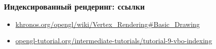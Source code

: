 \documentclass{beamer}
\begin{document}
\begin{frame}[fragile]
\frametitle{Индексированный рендеринг: ссылки}
\begin{itemize}
\item \href{https://www.khronos.org/opengl/wiki/Vertex_Rendering#Basic_Drawing}{khronos.org/opengl/wiki/Vertex\_Rendering\#Basic\_Drawing}
\item \href{http://www.opengl-tutorial.org/intermediate-tutorials/tutorial-9-vbo-indexing}{opengl-tutorial.org/intermediate-tutorials/tutorial-9-vbo-indexing}
\end{itemize}
\end{frame}
\end{document}
